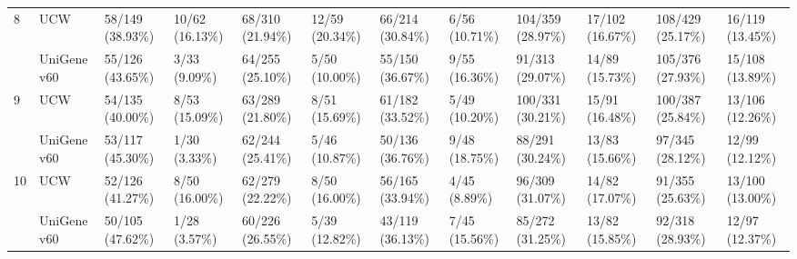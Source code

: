 \begin{sidewaystable}
\begin{localsize}{6}{7}
\begin{tabular}{llp{1cm}p{1cm}p{1cm}p{1cm}p{1cm}p{1cm}p{1cm}p{1cm}p{1cm}p{1cm}}
 \midrule
 8          & UCW         & 58/149 (38.93\%)   & 10/62 (16.13\%)    & 68/310 (21.94\%)    & 12/59 (20.34\%)     & 66/214 (30.84\%)    & 6/56 (10.71\%)      & 104/359 (28.97\%)   & 17/102 (16.67\%)    & 108/429 (25.17\%)          & 16/119 (13.45\%)          \\
            & UniGene v60 & 55/126 (43.65\%)   & 3/33    (9.09\%)   & 64/255 (25.10\%)    & 5/50 (10.00\%)      & 55/150 (36.67\%)    & 9/55 (16.36\%)      & 91/313 (29.07\%)    & 14/89 (15.73\%)     & 105/376 (27.93\%)          & 15/108 (13.89\%)          \\
 \midrule
 9          & UCW         & 54/135 (40.00\%)   & 8/53 (15.09\%)     & 63/289 (21.80\%)    & 8/51 (15.69\%)      & 61/182 (33.52\%)    & 5/49 (10.20\%)      & 100/331 (30.21\%)   & 15/91 (16.48\%)     & 100/387 (25.84\%)          & 13/106 (12.26\%)          \\
            & UniGene v60 & 53/117 (45.30\%)   & 1/30    (3.33\%)   & 62/244 (25.41\%)    & 5/46 (10.87\%)      & 50/136 (36.76\%)    & 9/48 (18.75\%)      & 88/291 (30.24\%)    & 13/83 (15.66\%)     & 97/345 (28.12\%)           & 12/99 (12.12\%)           \\
 \midrule
 10         & UCW         & 52/126 (41.27\%)   & 8/50 (16.00\%)     & 62/279 (22.22\%)    & 8/50 (16.00\%)      & 56/165 (33.94\%)    & 4/45    (8.89\%)    & 96/309 (31.07\%)    & 14/82 (17.07\%)     & 91/355 (25.63\%)           & 13/100 (13.00\%)          \\
            & UniGene v60 & 50/105 (47.62\%)   & 1/28    (3.57\%)   & 60/226 (26.55\%)    & 5/39 (12.82\%)      & 43/119 (36.13\%)    & 7/45 (15.56\%)      & 85/272 (31.25\%)    & 13/82 (15.85\%)     & 92/318 (28.93\%)           & 12/97 (12.37\%)           \\
\bottomrule
\end{tabular}
\end{localsize}
\end{sidewaystable}
